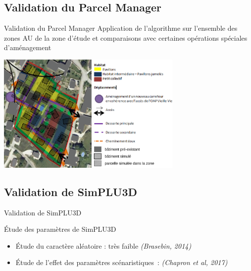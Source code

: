 \documentclass[xcolor=table]{beamer}
\begin{document}
\begin{frame}
\subsectionpage
\end{frame}

\subsection{Validation du Parcel Manager}

\begin{frame}{Validation du Parcel Manager}
	Application de l'algorithme sur l'ensemble des zones AU de la zone d'étude et comparaisons avec certaines opérations spéciales d'aménagement
	\begin{block}{}
		\includegraphics[width=9cm]{Images/OAPTour-de-Say2.png}
	\end{block}
\end{frame}

\begin{frame}
\subsectionpage
\end{frame}

\subsection{Validation de SimPLU3D}

\begin{frame}{Validation de SimPLU3D}
	\begin{block}{Étude des paramètres de SimPLU3D}
		\begin{itemize}
			\item Étude du caractère aléatoire : très faible \textit{(Brasebin, 2014)}
			\item Étude de l'effet des paramètres scénaristiques~: \textit{(Chapron et al, 2017)}
		\end{itemize}
	\end{block}
\end{frame}
\end{document}
